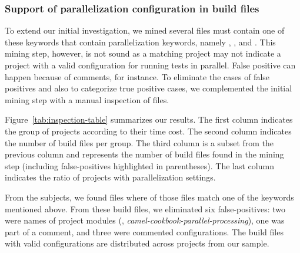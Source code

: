 
\subsubsection{Support of parallelization configuration in build files}
\label{sec:rqC-2}


To extend our initial investigation, we mined several \pomf{} files
must contain one of these keywords that contain parallelization
keywords, namely , , and
.  This mining step, however, is not sound as a
matching project may not indicate a project with a valid configuration
for running tests in parallel.  False positive can happen because of
comments, for instance.  To eliminate the cases of false positives and
also to categorize true positive cases, we complemented the initial
mining step with a manual inspection of files.


Figure~\ref{tab:inspection-table} summarizes our results. The first
column indicates the group of projects according to their time cost.
The second column indicates the number of build files per group.  The
third column is a subset from the previous column and represents the
number of build files found in the mining step (including
false-positives highlighted in parentheses). The last column indicates
the ratio of projects with parallelization settings.

From the \numMedLong{} subjects, we found \pomMedLong{} \pomf{} files
where \numPomMatched{} of those files match one of the keywords
mentioned above.  From these \numPomMatched{} build files, we
eliminated six false-positives: two were names of project modules
(\eg, \emph{camel-cookbook-parallel-processing}), one was part of a
comment, and three were commented configurations. The
\numPomMatchedValid{} build files with valid configurations are
distributed across \numProjectsPar{} projects from our sample.
% 

